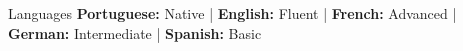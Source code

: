 \begin{rubric}{Languages}
  \entry* \textbf{Portuguese:} Native | \textbf{English:} Fluent | \textbf{French:} Advanced | \textbf{German:} Intermediate | \textbf{Spanish:} Basic
\end{rubric}

